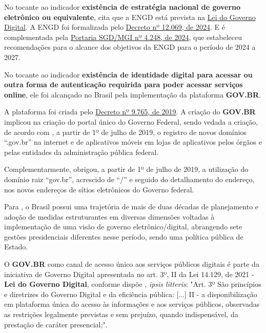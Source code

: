 No tocante ao indicador \textbf{existência de estratégia nacional de governo
eletrônico ou equivalente}, \cite{brasil_engd} cita que a ENGD está prevista na \href{https://www.planalto.gov.br/ccivil_03/_ato2019-2022/2021/lei/l14129.htm}{Lei do Governo Digital}. A ENGD foi formalizada pelo \href{https://www.planalto.gov.br/ccivil_03/_ato2023-2026/2024/decreto/D12069.htm}{Decreto nº 12.069, de 2024}. E é complementada pela \href{https://www.in.gov.br/en/web/dou/-/portaria-sgd/mgi-n-4.248-de-26-de-junho-de-2024-568659997}{Portaria SGD/MGI nº 4.248, de 2024}, que estabeleceu recomendações para o alcance dos objetivos da ENGD para o período de 2024 a 2027.

No tocante ao indicador \textbf{existência de identidade digital para acessar
ou outra forma de autenticação requirida para poder acessar serviços online}, ele foi alcançado no Brasil pela implementação da plataforma \textbf{GOV.BR}. 

A plataforma foi criada pelo \href{https://www.planalto.gov.br/ccivil_03/_ato2019-2022/2019/decreto/d9756.htm}{Decreto nº 9.765, de 2019}. A criação do \textbf{GOV.BR} implicou na criação do portal único do Governo Federal, sendo vedada a criação, de acordo com \cite{d9756}, a partir de 1º de julho de 2019, o registro de novos domínios “.gov.br” na internet e de aplicativos móveis em lojas de aplicativos pelos órgãos e pelas entidades da administração pública federal.

Complementarmente, \cite{d9756} obrigou, a partir de 1º de julho de 2019, a utilização do domínio raiz “gov.br”, acrescido de “/” e seguido do detalhamento do endereço, nos novos endereços de sítios eletrônicos do Governo federal.

Para \cite{mitkiewicz2024transformacao}, o Brasil possui uma trajetória de mais de duas décadas de planejamento e adoção de medidas estruturantes em diversas dimensões voltadas à implementação de uma visão de governo eletrônico/digital, abrangendo sete gestões presidenciais diferentes nesse período, sendo uma política pública de Estado.

O \textbf{GOV.BR} como canal de acesso único aos serviços públicos digitais é parte da iniciativa de Governo Digital apresentada no art. 3º, II da Lei 14.129, de 2021 - \textbf{Lei do Governo Digital}, conforme dispõe \cite{l14129}, \textit{ipsis litteris}: "Art. 3º  São princípios e diretrizes do Governo Digital e da eficiência pública: [...] II - a disponibilização em plataforma única do acesso às informações e aos serviços públicos, observadas as restrições legalmente previstas e sem prejuízo, quando indispensável, da prestação de caráter presencial;".

